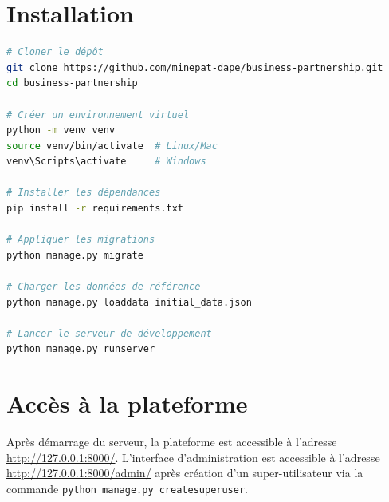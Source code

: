 \documentclass[12pt, a4paper, oneside]{report}
\begin{document}
\section*{Installation}

\begin{lstlisting}[language=bash, caption={Procédure d'installation de la plateforme}]
# Cloner le dépôt
git clone https://github.com/minepat-dape/business-partnership.git
cd business-partnership

# Créer un environnement virtuel
python -m venv venv
source venv/bin/activate  # Linux/Mac
venv\Scripts\activate     # Windows

# Installer les dépendances
pip install -r requirements.txt

# Appliquer les migrations
python manage.py migrate

# Charger les données de référence
python manage.py loaddata initial_data.json

# Lancer le serveur de développement
python manage.py runserver
\end{lstlisting}

\section*{Accès à la plateforme}

Après démarrage du serveur, la plateforme est accessible à l'adresse \url{http://127.0.0.1:8000/}. L'interface d'administration est accessible à l'adresse \url{http://127.0.0.1:8000/admin/} après création d'un super-utilisateur via la commande \texttt{python manage.py createsuperuser}.
\end{document}
